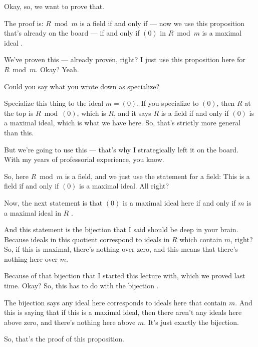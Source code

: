 \begin{speech}[00:22:36 - 00:23:14]
Okay, so, we want to prove that.

The proof is: $R \bmod m$ is a field if and only if --- now we use this proposition that's already on the board --- if and only if $(0)$ in $R \bmod m$ is a maximal ideal .

We've proven this --- already proven, right?  I just use this proposition here for $R \bmod m$. Okay? Yeah.
\end{speech}

\begin{student}
Could you say what you wrote down as specialize?
\end{student}

\begin{speech}[00:23:17 - 00:23:57]
Specialize this thing to the ideal $m = (0)$. If you specialize to $(0)$, then $R$ at the top is $R \bmod (0)$, which is $R$, and it says $R$ is a field if and only if $(0)$ is a maximal ideal, which is what we have here. So, that's strictly more general than this.

But we're going to use this --- that's why I strategically left it on the board. With my years of professorial experience, you know. 

So, here $R \bmod m$ is a field, and we just use the statement for a field: This is a field if and only if $(0)$ is a maximal ideal. All right?
\end{speech}

\begin{speech}[00:23:57 - 00:25:02]
Now, the next statement is that $(0)$ is a maximal ideal here if and only if $m$ is a maximal ideal in $R$ .

And this statement is the bijection that I said should be deep in your brain. Because ideals in this quotient correspond to ideals in $R$ which contain $m$, right? So, if this is maximal, there's nothing over zero, and this means that there's nothing here over $m$.

Because of that bijection that I started this lecture with, which we proved last time. Okay? So, this has to do with the bijection .

The bijection says any ideal here corresponds to ideals here that contain $m$. And this is saying that if this is a maximal ideal, then there aren't any ideals here above zero, and there's nothing here above $m$. It's just exactly the bijection.

So, that's the proof of this proposition.
\end{speech}


